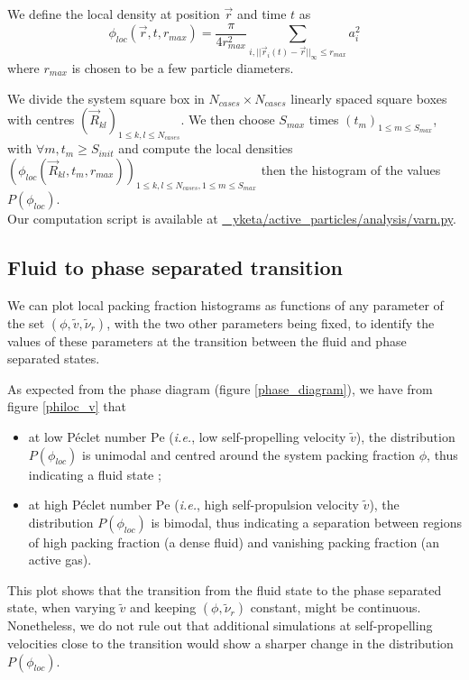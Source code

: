 \documentclass[class=report, float=false, crop=false]{standalone}
\begin{document}
We define the local density at position $\vec{r}$ and time $t$ as
\begin{equation}
\phi_{loc}(\vec{r}, t, r_{max}) = \frac{\pi}{4r_{max}^2} \sum_{i, ||\vec{r}_i(t) - \vec{r}||_{\infty} \leq r_{max}} a_i^2
\label{philoc}
\end{equation}
where $r_{max}$ is chosen to be a few particle diameters.


We divide the system square box in $N_{cases} \times N_{cases}$ linearly spaced square boxes with centres $(\vec{R}_{kl})_{1 \leq k, l \leq N_{cases}}$. We then choose $S_{max}$ times $(t_m)_{1 \leq m \leq S_{max}}$, with $\forall m, t_m \geq S_{init}$ and compute the local densities $(\phi_{loc}(\vec{R}_{kl}, t_m, r_{max}))_{1 \leq k, l \leq N_{cases}, 1 \leq m \leq S_{max}}$ then the histogram of the values $P(\phi_{loc})$.\\

Our computation script is available at \href{https://github.com/yketa/active_particles/blob/master/analysis/varn.py}{{\faGithub~ yketa/active\_particles/analysis/varn.py}}.

\subsection{Fluid to phase separated transition}

We can plot local packing fraction histograms as functions of any parameter of the set $(\phi, \tilde{v}, \tilde{\nu}_r)$, with the two other parameters being fixed, to identify the values of these parameters at the transition between the fluid and phase separated states.


As expected from the phase diagram (figure \ref{phase_diagram}), we have from figure \ref{philoc_v} that
\begin{itemize}
  \item at low P\'eclet number $\text{Pe}$ (\textit{i.e.}, low self-propelling velocity $\tilde{v}$), the distribution $P(\phi_{loc})$ is unimodal and centred around the system packing fraction $\phi$, thus indicating a fluid state ;
  \item at high P\'eclet number $\text{Pe}$ (\textit{i.e.}, high self-propulsion velocity $\tilde{v}$), the distribution $P(\phi_{loc})$ is bimodal, thus indicating a separation between regions of high packing fraction (a dense fluid) and vanishing packing fraction (an active gas).
\end{itemize}
This plot shows that the transition from the fluid state to the phase separated state, when varying $\tilde{v}$ and keeping $(\phi, \tilde{\nu}_r)$ constant, might be continuous. Nonetheless, we do not rule out that additional simulations at self-propelling velocities close to the transition would show a sharper change in the distribution $P(\phi_{loc})$.
\end{document}
